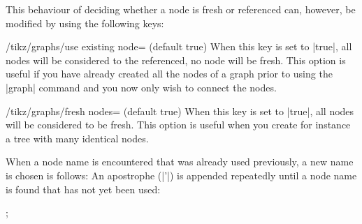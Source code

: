 This behaviour of deciding whether a node is fresh or referenced can,
however, be modified by using the following keys:
\begin{key}{/tikz/graphs/use existing node= (default true)}
  When this key is set to |true|, all nodes will be considered to the
  referenced, no node will be fresh. This option is useful if you have
  already created all the nodes of a graph prior to using the |graph|
  command and you now only wish to connect the nodes.
\end{key}
\begin{key}{/tikz/graphs/fresh nodes= (default true)}
  When this key is set to |true|, all nodes will be considered to be
  fresh. This option is useful when you create for instance a tree
  with many identical nodes.

  When a node name is encountered that was already used previously,
  a new name is chosen is follows: An apostrophe (|'|) is appended
  repeatedly until a node name is found that has not yet been
  used:
\begin{codeexample}[]
\tikz {};
\end{codeexample}
\end{key}

